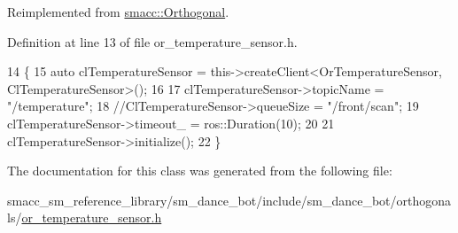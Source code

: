 Reimplemented from \hyperlink{classsmacc_1_1Orthogonal_a7a3da420b1554e20aea3ed01067df05c}{smacc\+::\+Orthogonal}.



Definition at line 13 of file or\+\_\+temperature\+\_\+sensor.\+h.


\begin{DoxyCode}
14     \{
15         \textcolor{keyword}{auto} clTemperatureSensor = this->createClient<OrTemperatureSensor, ClTemperatureSensor>();
16 
17         clTemperatureSensor->topicName = \textcolor{stringliteral}{"/temperature"};
18         \textcolor{comment}{//ClTemperatureSensor->queueSize = "/front/scan";}
19         clTemperatureSensor->timeout\_ = ros::Duration(10);
20 
21         clTemperatureSensor->initialize();
22     \}
\end{DoxyCode}


The documentation for this class was generated from the following file\+:\begin{DoxyCompactItemize}
\item 
smacc\+\_\+sm\+\_\+reference\+\_\+library/sm\+\_\+dance\+\_\+bot/include/sm\+\_\+dance\+\_\+bot/orthogonals/\hyperlink{or__temperature__sensor_8h}{or\+\_\+temperature\+\_\+sensor.\+h}\end{DoxyCompactItemize}
